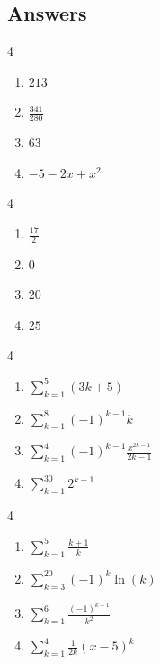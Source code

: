 \documentclass{ximera}
\begin{document}
	\author{Stitz-Zeager}


\subsection{Answers}

\begin{multicols}{4} 
\begin{enumerate}

\item $213$
\item $\frac{341}{280}$
\item $63$
\item $-5 - 2x + x^{2}$

\setcounter{HW}{\value{enumi}}
\end{enumerate}
\end{multicols}

\begin{multicols}{4} 
\begin{enumerate}
\setcounter{enumi}{\value{HW}}


\item $\frac{17}{2}$
\item $0$
\item  $20$
\item  $25$

\setcounter{HW}{\value{enumi}}
\end{enumerate}
\end{multicols}


\begin{multicols}{4} 
\begin{enumerate}
\setcounter{enumi}{\value{HW}}

\item $\displaystyle \sum_{k = 1}^{5} (3k + 5)$
\item $\displaystyle \sum_{k = 1}^{8} (-1)^{k - 1}k$
\item $\displaystyle \sum_{k = 1}^{4} (-1)^{k - 1} \frac{x^{2k - 1}}{2k - 1}$
\item $\displaystyle \sum_{k = 1}^{30} 2^{k-1}$

\setcounter{HW}{\value{enumi}}
\end{enumerate}
\end{multicols}


\begin{multicols}{4} 
\begin{enumerate}
\setcounter{enumi}{\value{HW}}


\item $\displaystyle \sum_{k = 1}^{5} \frac{k + 1}{k}$
\item $\displaystyle \sum_{k = 3}^{20} (-1)^{k} \ln(k)$
\item $\displaystyle \sum_{k = 1}^{6} \frac{(-1)^{k - 1}}{k^{2}}$
\item $\displaystyle \sum_{k = 1}^{4} \frac{1}{2k}(x - 5)^{k}$

\setcounter{HW}{\value{enumi}}
\end{enumerate}
\end{multicols}
\end{document}
